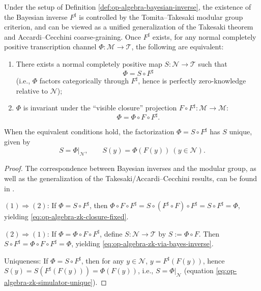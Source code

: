 \begin{theorem}\label{thm:op-algebra-bayes-inverse-zk}
Under the setup of Definition \ref{def:op-algebra-bayesian-inverse},
the existence of the Bayesian inverse \(F^\sharp\) is controlled by the Tomita--Takesaki modular group criterion, and can be viewed as a unified generalization of the Takesaki theorem and Accardi--Cecchini coarse-graining.
Once \(F^\sharp\) exists, for any normal completely positive transcription channel \(\Phi:\mathcal{M}\to\mathcal{T}\), the following are equivalent:
\begin{enumerate}
  \item There exists a normal completely positive map \(S:\mathcal{N}\to\mathcal{T}\) such that
  \begin{equation}\label{eq:op-algebra-zk-via-bayes-inverse}
  \boxed{\;\Phi = S\circ F^\sharp\;}
  \end{equation}
  (i.e., \(\Phi\) factors categorically through \(F^\sharp\), hence is perfectly zero-knowledge relative to \(\mathcal{N}\));
  \item \(\Phi\) is invariant under the ``visible closure'' projection \(F\circ F^\sharp:\mathcal{M}\to\mathcal{M}\):
  \begin{equation}\label{eq:op-algebra-zk-closure-fixed}
  \boxed{\;\Phi=\Phi\circ F\circ F^\sharp.\;}
  \end{equation}
\end{enumerate}
When the equivalent conditions hold, the factorization \(\Phi=S\circ F^\sharp\) has \(S\) unique, given by
\begin{equation}\label{eq:op-algebra-zk-simulator-unique}
\boxed{\;S=\Phi|_{\mathcal{N}},\qquad S(y)=\Phi(F(y))\ (y\in\mathcal{N}).\;}
\end{equation}
\end{theorem}

\begin{proof}
The correspondence between Bayesian inverses and the modular group, as well as the generalization of the Takesaki/Accardi--Cecchini results, can be found in \cite{GiorgettiEtAl2023BayesianInversionModularGroup}.
\par
\((1)\Rightarrow(2)\): If \(\Phi=S\circ F^\sharp\), then
\(
\Phi\circ F\circ F^\sharp=S\circ (F^\sharp\circ F)\circ F^\sharp=S\circ F^\sharp=\Phi
\), yielding \eqref{eq:op-algebra-zk-closure-fixed}.
\par
\((2)\Rightarrow(1)\): If \(\Phi=\Phi\circ F\circ F^\sharp\), define \(S:\mathcal{N}\to\mathcal{T}\) by \(S:=\Phi\circ F\).
Then
\(
S\circ F^\sharp=\Phi\circ F\circ F^\sharp=\Phi
\), yielding \eqref{eq:op-algebra-zk-via-bayes-inverse}.
\par
Uniqueness: If \(\Phi=S\circ F^\sharp\), then for any \(y\in\mathcal{N}\), \(y=F^\sharp(F(y))\), hence
\(
S(y)=S(F^\sharp(F(y)))=\Phi(F(y))
\), i.e., \(S=\Phi|_{\mathcal{N}}\) (equation \eqref{eq:op-algebra-zk-simulator-unique}).
\qedhere
\end{proof}

